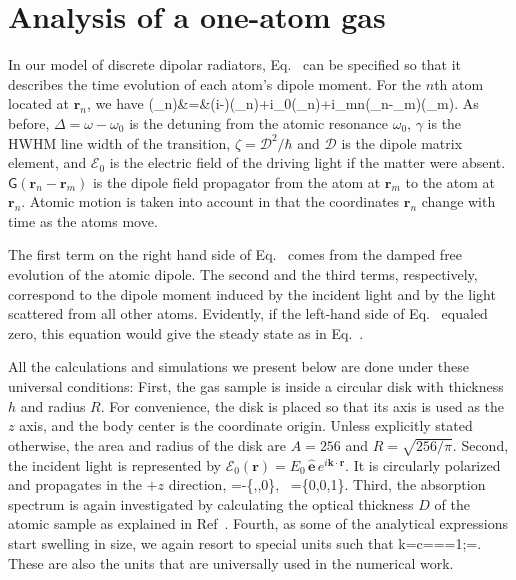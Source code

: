 \section{Analysis of a one-atom gas}
In our model of discrete dipolar radiators, Eq.~ can be specified so that it describes the time evolution of each atom's dipole moment. For the $n$th atom located at $\mathbf{r}_n$, we have
\bea
{}(_n)&=&(i\Delta-\gamma)(_n)+i\zeta{}_0(_n)+i\zeta\sum_{m\neq n}(_n-_m)(_m).
\label{DIPOLEEQ}
\eea
As before, $\Delta=\omega-\omega_0$ is the detuning from the atomic resonance $\omega_0$, $\gamma$ is the HWHM line width of the transition, $\zeta=\mathcal{D}^2/\hbar$ and $\mathcal{D}$ is the dipole matrix element, and $\mathbf{\mathcal{E}}_0$ is the electric field of the driving light if the matter were absent. $\mathsf{G}(\mathbf{r}_n-\mathbf{r}_m)$ is the dipole field propagator from the atom at $\mathbf{r}_m$ to the atom at $\mathbf{r}_n$. Atomic motion is taken into account in that the coordinates $\mathbf{r}_n$ change with time as the atoms move.

The first term on the right hand side of Eq.~ comes from the damped free evolution of the atomic dipole. The second and the third terms, respectively, correspond to the dipole moment induced by the incident light and by the light scattered  from all other atoms. Evidently, if the left-hand side of Eq.~ equaled zero, this equation would give the steady state as in Eq.~.

All the calculations and simulations we present below are done under these universal conditions:
First, the gas sample is inside a circular disk with thickness $h$ and radius $R$. For convenience, the disk is placed so that its axis is used as the $z$ axis, and the body center is the coordinate origin. Unless explicitly stated otherwise, the area and radius of the disk are $A=256$ and $R=\sqrt{256/\pi}$.
Second, the incident light is represented by $\mathcal{E}_0(\mathbf{r})=E_0\,\hat{\mathbf{e}}\,e^{i\mathbf{k}\cdot\mathbf{r}}$. It is circularly polarized and propagates in the $+z$ direction,
\bea
{}=-\{,,0\}, \, =\{0,0,1\}.
\eea
Third, the absorption spectrum is again investigated by calculating the optical thickness $D$ of the atomic sample as explained in Ref~\cite{0953-4075-44-19-195006}. 
Fourth, as some of the analytical expressions start swelling in size, we again resort to special units such that
\bea
k=c=\hbar==1;\quad {}=.
\label{UNITCONVENTION}
\eea 
These are also the units that are universally used in the numerical work.

